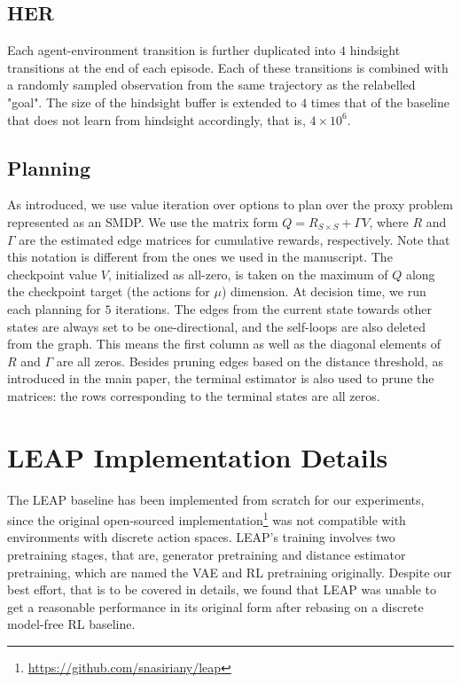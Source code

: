 \subsection{HER}
Each agent-environment transition is further duplicated into $4$ hindsight transitions at the end of each episode. Each of these transitions is combined with a randomly sampled observation from the same trajectory as the relabelled "goal". The size of the hindsight buffer is extended to $4$ times that of the baseline that does not learn from hindsight accordingly, that is, $4\times 10^{6}$.

\subsection{Planning}
As introduced, we use value iteration over options \citep{sutton1999between} to plan over the proxy problem represented as an SMDP. We use the matrix form $Q = R_{S \times S} + \Gamma V$, where $R$ and $\Gamma$ are the estimated edge matrices for cumulative rewards, respectively. Note that this notation is different from the ones we used in the manuscript. The checkpoint value $V$, initialized as all-zero, is taken on the maximum of $Q$ along the checkpoint target (the actions for $\mu$) dimension. At decision time, we run each planning for $5$ iterations. The edges from the current state towards other states are always set to be one-directional, and the self-loops are also deleted from the graph. This means the first column as well as the diagonal elements of $R$ and $\Gamma$ are all zeros. Besides pruning edges based on the distance threshold, as introduced in the main paper, the terminal estimator is also used to prune the matrices: the rows corresponding to the terminal states are all zeros.

\section{LEAP Implementation Details}
\label{sec:leap_exp_details}
The LEAP baseline has been implemented from scratch for our experiments, since the original open-sourced implementation\footnote{\url{https://github.com/snasiriany/leap}} was not compatible with environments with discrete action spaces. LEAP's training involves two pretraining stages, that are, generator pretraining and distance estimator pretraining, which are named the VAE and RL pretraining originally. Despite our best effort, that is to be covered in details, we found that LEAP was unable to get a reasonable performance in its original form after rebasing on a discrete model-free RL baseline.

